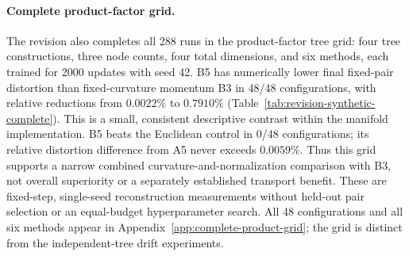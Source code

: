 \paragraph{Complete product-factor grid.}
The revision also completes all 288 runs in the product-factor tree grid: four tree constructions, three node counts, four total dimensions, and six methods, each trained for 2000 updates with seed 42. B5 has numerically lower final fixed-pair distortion than fixed-curvature momentum B3 in 48/48 configurations, with relative reductions from $0.0022\%$ to $0.7910\%$ (Table~\ref{tab:revision-synthetic-complete}). This is a small, consistent descriptive contrast within the manifold implementation. B5 beats the Euclidean control in 0/48 configurations; its relative distortion difference from A5 never exceeds $0.0059\%$. Thus this grid supports a narrow combined curvature-and-normalization comparison with B3, not overall superiority or a separately established transport benefit. These are fixed-step, single-seed reconstruction measurements without held-out pair selection or an equal-budget hyperparameter search. All 48 configurations and all six methods appear in Appendix~\ref{app:complete-product-grid}; the grid is distinct from the independent-tree drift experiments.
